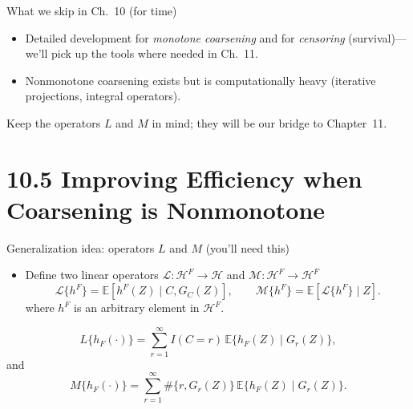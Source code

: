 \documentclass[xcolor=dvipsnames,aspectratio=169]{beamer}
\newcommand{\E}{\mathbb{E}}
\newcommand{\1}{\mathbbm{1}}
\begin{document}
\begin{frame}{What we skip in Ch.~10 (for time)}
  \begin{itemize}
    \item Detailed development for \emph{monotone coarsening} and for \emph{censoring} (survival)---we’ll pick up the tools where needed in Ch.~11.
    \item Nonmonotone coarsening exists but is computationally heavy (iterative projections, integral operators).
  \end{itemize}
  \begin{tcolorbox}[title=Pointer]
    Keep the operators $L$ and $M$ in mind; they will be our bridge to Chapter~11.
  \end{tcolorbox}
\end{frame}

\section{10.5 Improving Efficiency when Coarsening is Nonmonotone}

\begin{frame}{Generalization idea: operators $L$ and $M$ (you’ll need this)}
  \begin{tcolorbox}[colframe=red,title=Definition 4 and 5]
    \begin{itemize}
      \item Define two linear operators $\mathcal{L}:\mathcal{H}^{F}\to\mathcal{H}$ and  $\mathcal{M}:\mathcal{H}^{F}\to\mathcal{H}^{F}$
      \[
        \mathcal{L}\{h^{F}\} = \E\!\left[h^{F}(Z)\mid C,G_C(Z)\right],
        \qquad
        \mathcal{M}\{h^{F}\} = \E\!\left[\mathcal{L}\{h^{F}\}\mid Z\right].
      \]
      where $h^F$ is an arbitrary element in $\mathcal{H}^F$.
    \end{itemize}
  \end{tcolorbox}
    \[
        L\{h_F(\cdot)\} = \sum_{r=1}^{\infty} I(C=r)\,\E\{h_F(Z)\mid G_r(Z)\},
    \]
    and 
    \[
        M\{h_F(\cdot)\} = \sum_{r=1}^{\infty} \#\{r,G_r(Z)\}\,\E\{h_F(Z)\mid G_r(Z)\}.
    \]
\end{frame}
\end{document}
